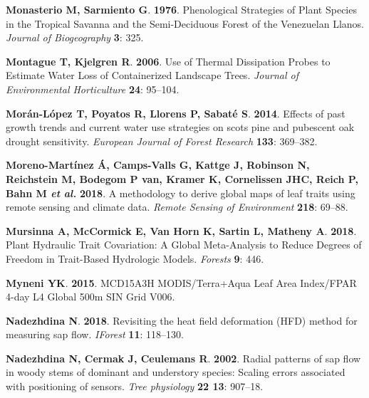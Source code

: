 \documentclass[11pt,twoside]{reedthesis}
\begin{document}
\hypertarget{ref-monasterio_phenological_1976}{}
\textbf{\textnormal{Monasterio M}, \textnormal{Sarmiento G}}.
\textbf{1976}. Phenological Strategies of Plant Species in the Tropical
Savanna and the Semi-Deciduous Forest of the Venezuelan Llanos.
\emph{Journal of Biogeography} \textbf{3}: 325.

\hypertarget{ref-Montague2006}{}
\textbf{\textnormal{Montague T}, \textnormal{Kjelgren R}}.
\textbf{2006}. Use of Thermal Dissipation Probes to Estimate Water Loss
of Containerized Landscape Trees. \emph{Journal of Environmental
Horticulture} \textbf{24}: 95--104.

\hypertarget{ref-moranlopez2014}{}
\textbf{\textnormal{Morán-López T}, \textnormal{Poyatos R},
\textnormal{Llorens P}, \textnormal{Sabaté S}}. \textbf{2014}. Effects
of past growth trends and current water use strategies on scots pine and
pubescent oak drought sensitivity. \emph{European Journal of Forest
Research} \textbf{133}: 369--382.

\hypertarget{ref-moreno-martinez_methodology_2018}{}
\textbf{\textnormal{Moreno-Martínez Á}, \textnormal{Camps-Valls G},
\textnormal{Kattge J}, \textnormal{Robinson N}, \textnormal{Reichstein
M}, \textnormal{Bodegom P van}, \textnormal{Kramer K},
\textnormal{Cornelissen JHC}, \textnormal{Reich P}, \textnormal{Bahn M}
\emph{et al.}} \textbf{2018}. A methodology to derive global maps of
leaf traits using remote sensing and climate data. \emph{Remote Sensing
of Environment} \textbf{218}: 69--88.

\hypertarget{ref-mursinna_plant_2018}{}
\textbf{\textnormal{Mursinna A}, \textnormal{McCormick E},
\textnormal{Van Horn K}, \textnormal{Sartin L}, \textnormal{Matheny A}}.
\textbf{2018}. Plant Hydraulic Trait Covariation: A Global Meta-Analysis
to Reduce Degrees of Freedom in Trait-Based Hydrologic Models.
\emph{Forests} \textbf{9}: 446.

\hypertarget{ref-Myneni2015}{}
\textbf{\textnormal{Myneni YK}}. \textbf{2015}. MCD15A3H
MODIS/Terra+Aqua Leaf Area Index/FPAR 4-day L4 Global 500m SIN Grid
V006.

\hypertarget{ref-Nadezhdina2018}{}
\textbf{\textnormal{Nadezhdina N}}. \textbf{2018}. Revisiting the heat
field deformation (HFD) method for measuring sap flow. \emph{IForest}
\textbf{11}: 118--130.

\hypertarget{ref-Nadezhdina2002}{}
\textbf{\textnormal{Nadezhdina N}, \textnormal{Cermak J},
\textnormal{Ceulemans R}}. \textbf{2002}. Radial patterns of sap flow in
woody stems of dominant and understory species: Scaling errors
associated with positioning of sensors. \emph{Tree physiology}
\textbf{22 13}: 907--18.
\end{document}
